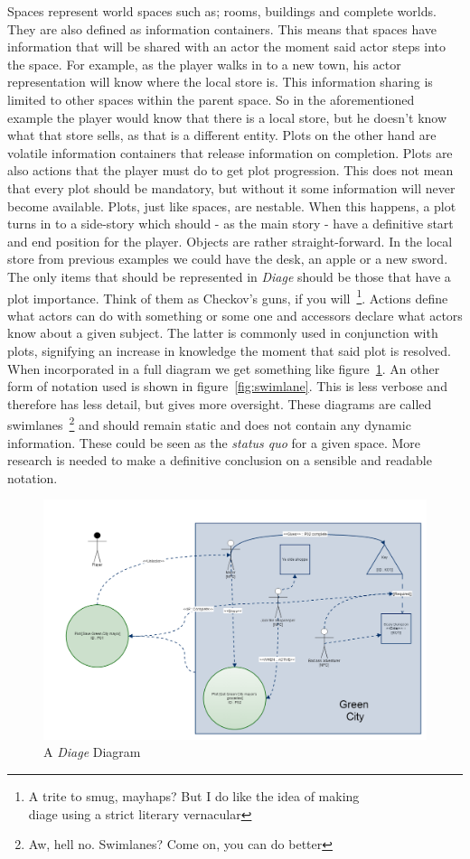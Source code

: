 \documentclass[11pt,a4paper,onecolumn,draft,titlepage]{article}
\newcommand{\diage}{\textsl{Diage }}
\begin{document}
Spaces represent world spaces such as; rooms, buildings and complete worlds. They are also defined as information containers. This means that spaces have information that will be shared with an actor the moment said actor steps into the space. For example, as the player walks in to a new town, his actor representation will know where the local store is. This information sharing is limited to other spaces within the parent space. So in the aforementioned example the player would know that there is a local store, but he doesn't know what that store sells, as that is a different entity.
Plots on the other hand are volatile information containers that release information on completion. Plots are also actions that the player must do to get plot progression. This does not mean that every plot should be mandatory, but without it some information will never become available. Plots, just like spaces, are nestable. When this happens, a plot turns in to a side-story which should - as the main story - have a definitive start and end position for the player.
Objects are rather straight-forward. In the local store from previous examples we could have the desk, an apple or a new sword. The only items that should be represented in \diage should be those that have a plot importance. Think of them as Checkov's guns, if you will~\footnote{A trite to smug, mayhaps? But I do like the idea of making \\diage using a strict literary vernacular}.
Actions define what actors can do with something or some one and accessors declare what actors know about a given subject. The latter is commonly used in conjunction with plots, signifying an increase in knowledge the moment that said plot is resolved. When incorporated in a full diagram we get something like figure~\ref{fig:diagram1}. An other form of notation used is shown in figure~\ref{fig:swimlane}. This is less verbose and therefore has less detail, but gives more oversight. These diagrams are called swimlanes~\footnote{Aw, hell no. Swimlanes? Come on, you can do better} and should remain static and does not contain any dynamic information. These could be seen as the \textit{status quo} for a given space. More research is needed to make a definitive conclusion on a sensible and readable notation.
\begin{figure}
\label{fig:diagram1}
\includegraphics[scale=0.3]{img/diagram_example_1}
\caption{A \diage Diagram}
\end{figure}
\end{document}

